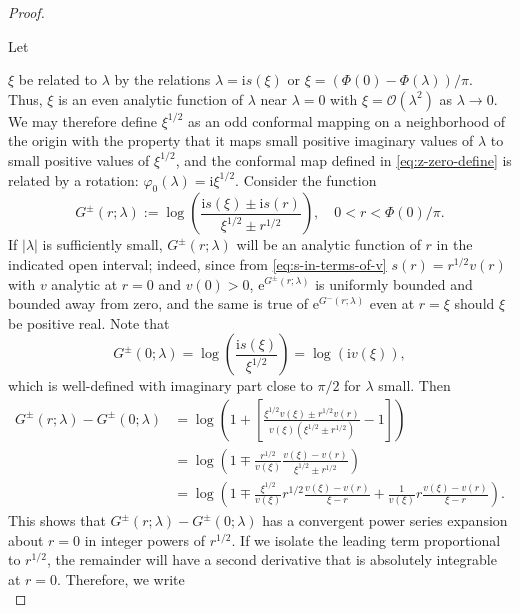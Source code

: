 \documentclass[12pt]{amsart}
\numberwithin{equation}{section}
\newcommand{\ee}{\mathrm{e}}
\newcommand{\ii}{\mathrm{i}}
\newcommand{\SP}{\lambda}
\newcommand{\phaseint}{\Phi}
\newcommand{\rr}{r}
\newcommand{\bigo}[1]{ \mathcal{O}\! \left( #1 \right) }
\begin{document}
\begin{proof}
\hypertarget{proof:Yzetasmall}{Let} $\xi$ be related to $\SP$ by the relations $\SP=\ii s(\xi)$ or $\xi=(\phaseint(0)-\phaseint(\SP))/\pi$.  Thus, $\xi$ is an even analytic function of $\SP$ near $\SP=0$ with $\xi=\bigo{\SP^2}$ as $\SP\to 0$.  We may therefore define $\xi^{1/2}$ as an odd conformal mapping on a neighborhood of the origin with the property that it maps small positive imaginary values of $\SP$ to small positive values of $\xi^{1/2}$, and the conformal map defined in \eqref{eq:z-zero-define} is related by a rotation:  $\varphi_0(\SP)=\ii\xi^{1/2}$.
Consider the function
\begin{equation}
G^\pm(\rr;\SP):=\log\left(\frac{\ii s(\xi)\pm \ii s(\rr)}{\xi^{1/2}\pm \rr^{1/2}}\right),\quad 0<\rr<\phaseint(0)/\pi.
\label{Gpm-def}
\end{equation}
If $|\SP|$ is sufficiently small, $G^\pm(\rr;\SP)$ will be an analytic function of $\rr$ in the indicated open interval; indeed, since from \eqref{eq:s-in-terms-of-v} $s(\rr)=\rr^{1/2}v(\rr)$ with $v$ analytic at $\rr=0$ and $v(0)>0$, $\ee^{G^\pm(\rr;\SP)}$
is uniformly bounded and bounded away from zero, and the same is true of $\ee^{G^-(\rr;\SP)}$ even at $\rr=\xi$ should $\xi$ be positive real.  Note that
\begin{equation}
G^\pm(0;\SP)=\log\left(\frac{\ii s(\xi)}{\xi^{1/2}}\right) = \log(\ii v(\xi)),
\end{equation}
which is well-defined with imaginary part close to $\pi/2$ for $\SP$ small.  Then
\begin{equation}
\begin{split}
G^\pm(\rr;\SP)-G^\pm(0;\SP)&=\log\left(1+\left[\frac{\xi^{1/2}v(\xi)\pm \rr^{1/2}v(\rr)}{v(\xi)(\xi^{1/2}\pm \rr^{1/2})}-1\right]\right)\\
&=\log\left(1\mp \frac{\rr^{1/2}}{v(\xi)}\frac{v(\xi)-v(\rr)}{\xi^{1/2}\pm \rr^{1/2}}\right)\\
&=\log\left(1\mp \frac{\xi^{1/2}}{v(\xi)}\rr^{1/2}\frac{v(\xi)-v(\rr)}{\xi-\rr} + \frac{1}{v(\xi)}\rr\frac{v(\xi)-v(\rr)}{\xi-\rr}\right).
\end{split}
\end{equation}
This shows that $G^\pm(\rr;\SP)-G^\pm(0;\SP)$ has a convergent power series expansion about $\rr=0$ in integer powers of $\rr^{1/2}$.  If we isolate the leading term proportional to $\rr^{1/2}$, the remainder will have a second derivative that is absolutely integrable at $\rr=0$.  Therefore, we write
\begin{equation}

\end{equation}
\end{proof}
\end{document}
